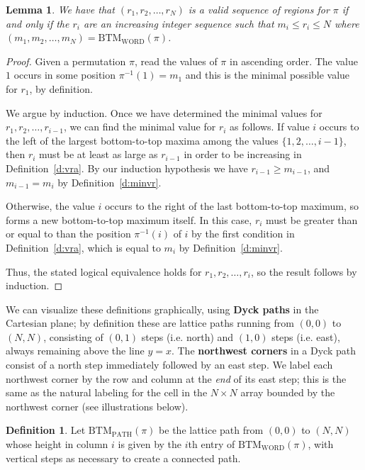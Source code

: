\documentclass[11pt]{amsart}   %
\newtheorem{lemma}[theorem]{Lemma}
\theoremstyle{definition}
\newtheorem{definition}[theorem]{Definition}
\theoremstyle{remark}
\numberwithin{equation}{section}
\theoremstyle{theorem}
\newcommand{\BTMW}{\mathrm{BTM_{WORD}}}
\newcommand{\BTMP}{\mathrm{BTM_{PATH}}}
\begin{document}
\begin{lemma}\label{l:vr}
We have that $(r_1, r_2, \ldots, r_N)$ is a valid sequence of regions for $\pi$
if and only if the $r_i$ are an increasing integer sequence such that $m_i \leq
r_i \leq N$ where $(m_1, m_2, \ldots, m_N) = \BTMW(\pi)$.
\end{lemma}
\begin{proof}
Given a permutation $\pi$, read the values of $\pi$ in ascending order.  The
value $1$ occurs in some position $\pi^{-1}(1) = m_1$ and this is the minimal
possible value for $r_1$, by definition. 

We argue by induction.  Once we have determined the minimal values for $r_1,
r_2, \ldots, r_{i-1}$, we can find the minimal value for $r_i$ as follows.  If
value $i$ occurs to the left of the largest bottom-to-top maxima among the
values $\{1, 2, \ldots, i-1\}$, then $r_i$ must be at least as large as
$r_{i-1}$ in order to be increasing in Definition~\ref{d:vra}.  By our
induction hypothesis we have $r_{i-1} \geq m_{i-1}$, and $m_{i-1} = m_i$ by
Definition~\ref{d:minvr}.

Otherwise, the value $i$ occurs to the right of the last bottom-to-top maximum,
so forms a new bottom-to-top maximum itself.  In this case, $r_i$ must be
greater than or equal to than the position $\pi^{-1}(i)$ of $i$ by the first
condition in Definition~\ref{d:vra}, which is equal to $m_i$ by
Definition~\ref{d:minvr}.

Thus, the stated logical equivalence holds for $r_1, r_2, \ldots, r_i$, so the
result follows by induction.
\end{proof}

We can visualize these definitions graphically, using {\bf Dyck paths} in the
Cartesian plane; by definition these are lattice paths running from $(0,0)$ to
$(N,N)$, consisting of $(0,1)$ steps (i.e.  north) and $(1,0)$ steps (i.e.
east), always remaining above the line $y = x$.  The {\bf northwest corners} in
a Dyck path consist of a north step immediately followed by an east step.  We
label each northwest corner by the row and column at the {\em end} of its
east step; this is the same as the natural labeling for the cell in the $N
\times N$ array bounded by the northwest corner (see illustrations below).

\begin{definition}\label{d:btm}
Let $\BTMP(\pi)$ be the lattice path from $(0,0)$ to $(N,N)$ whose height in
column $i$ is given by the $i$th entry of $\BTMW(\pi)$, with vertical steps as
necessary to create a connected path.
\end{definition}
\end{document}
